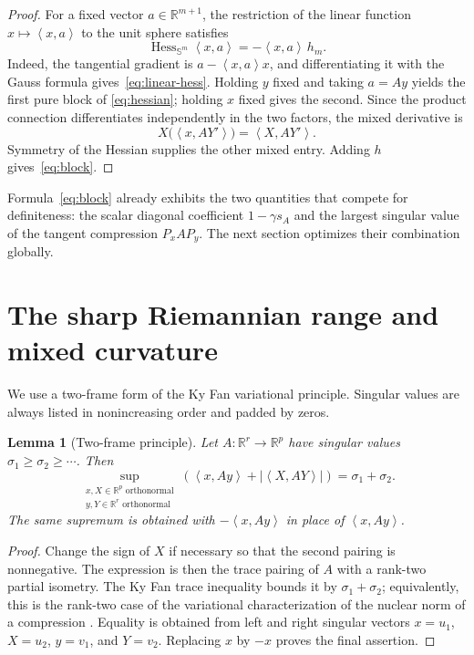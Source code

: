 \documentclass[11pt]{amsart}
\newtheorem{lemma}[theorem]{Lemma}
\theoremstyle{definition}
\theoremstyle{remark}
\DeclareMathOperator{\Hess}{Hess}
\newcommand{\R}{\mathbb R}
\newcommand{\Sph}{\mathbb S}
\newcommand{\ip}[2]{\left\langle #1,#2\right\rangle}
\begin{document}
\begin{proof}
For a fixed vector $a\in\R^{m+1}$, the restriction of the linear
function $x\mapsto\ip{x}{a}$ to the unit sphere satisfies
\begin{equation}\label{eq:linear-hess}
 \Hess_{\Sph^m}\ip{x}{a}=-\ip{x}{a}\,h_m.
\end{equation}
Indeed, the tangential gradient is $a-\ip{x}{a}x$, and differentiating
it with the Gauss formula gives~\eqref{eq:linear-hess}.  Holding $y$
fixed and taking $a=Ay$ yields the first pure block of
\eqref{eq:hessian}; holding $x$ fixed gives the second.  Since the
product connection differentiates independently in the two factors,
the mixed derivative is
\[
 X\big(\ip{x}{AY'}\big)=\ip{X}{AY'}.
\]
Symmetry of the Hessian supplies the other mixed entry.  Adding $h$
gives~\eqref{eq:block}.
\end{proof}

Formula~\eqref{eq:block} already exhibits the two quantities that
compete for definiteness: the scalar diagonal coefficient
$1-\gamma s_A$ and the largest singular value of the tangent
compression $P_xAP_y$.  The next section optimizes their combination
globally.

\section{The sharp Riemannian range and mixed curvature}
\label{sec:positive}

We use a two-frame form of the Ky Fan variational principle.  Singular
values are always listed in nonincreasing order and padded by zeros.

\begin{lemma}[Two-frame principle]\label{lem:kyfan}
Let $A:\R^r\to\R^p$ have singular values
$\sigma_1\geq\sigma_2\geq\cdots$.  Then
\begin{equation}\label{eq:kyfan}
 \sup_{\substack{x,X\in\R^p\text{ orthonormal}\\
                  y,Y\in\R^r\text{ orthonormal}}}
 \left(\ip{x}{Ay}+\left|\ip{X}{AY}\right|\right)
 =\sigma_1+\sigma_2.
\end{equation}
The same supremum is obtained with $-\ip{x}{Ay}$ in place of
$\ip{x}{Ay}$.
\end{lemma}

\begin{proof}
Change the sign of $X$ if necessary so that the second pairing is
nonnegative.  The expression is then the trace pairing of $A$ with a
rank-two partial isometry.  The Ky Fan trace inequality bounds it by
$\sigma_1+\sigma_2$; equivalently, this is the rank-two case of the
variational characterization of the nuclear norm of a compression
\cite[Chapter~III]{Bhatia1997}.
Equality is obtained from left and right singular vectors
$x=u_1$, $X=u_2$, $y=v_1$, and $Y=v_2$.  Replacing $x$ by $-x$
proves the final assertion.
\end{proof}
\end{document}
